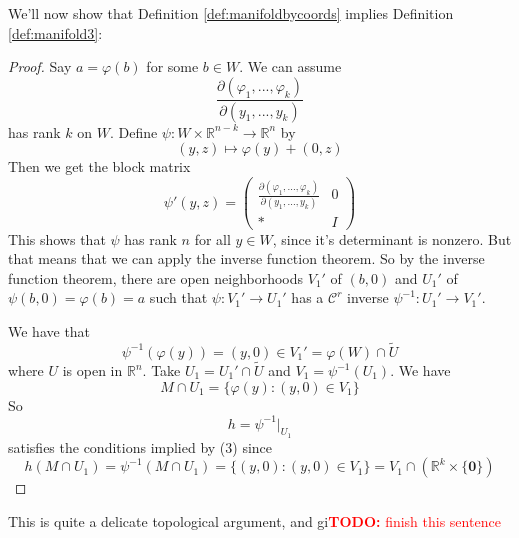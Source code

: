 \documentclass{article}
\newcommand{\reals}[0]{\mathbb{R}}
\newcommand{\mc}[1]{\mathcal{#1}}
\newcommand{\prt}[2]{\frac{\partial #1}{\partial #2}}
\newcommand{\mb}[1]{\mathbf{#1}}
\newcommand{\TODO}[1]{\textcolor{red}{\textbf{TODO:} #1}}
\begin{document}
We'll now show that Definition \ref{def:manifoldbycoords} implies Definition \ref{def:manifold3}:
\begin{proof}
  Say \(a = \varphi(b)\) for some \(b \in W\). We can assume
  \begin{equation}\prt{(\varphi_1,...,\varphi_k)}{(y_1,...,y_k)}\end{equation}
  has rank \(k\) on \(W\).
  Define \(\psi: W \times \reals^{n - k} \to\reals^n\) by
  \begin{equation}(y, z) \mapsto \varphi(y) + (0, z)\end{equation}
  Then we get the block matrix
  \begin{equation}\psi'(y, z) = \begin{pmatrix}
    \prt{(\varphi_1,...,\varphi_k)}{(y_1,...,y_k)} & 0 \\
    * & I
  \end{pmatrix}\end{equation}
  This shows that \(\psi\) has rank \(n\) for all \(y \in W\), since it's determinant is nonzero. But that means that we can apply the inverse function theorem. So by the inverse function theorem, there are open neighborhoods \(V_1'\) of \((b, 0)\) and \(U_1'\) of \(\psi(b, 0) = \varphi(b) = a\) such that \(\psi: V_1' \to U_1'\) has a \(\mc{C}^r\) inverse \(\psi^{-1}: U_1' \to V_1'\).

  We have that
  \begin{equation}\psi^{-1}(\varphi(y)) = (y, 0) \in V_1' = \varphi(W) \cap \widetilde U\end{equation}
  where \(U\) is open in \(\reals^n\). Take \(U_1 = U_1' \cap \widetilde U\) and \(V_1 = \psi^{-1}(U_1)\). We have
  \begin{equation}M \cap U_1 = \{\varphi(y) : (y, 0) \in V_1\}\end{equation}
  So
  \begin{equation}h = \psi^{-1}|_{U_1}\end{equation}
  satisfies the conditions implied by (3) since
  \begin{equation}h(M \cap U_1) = \psi^{-1}(M \cap U_1) = \{(y, 0) : (y, 0) \in V_1\} = V_1 \cap (\reals^k \times \{\mb{0}\})\end{equation}
\end{proof}
This is quite a delicate topological argument, and gi\TODO{finish this sentence}
\end{document}

